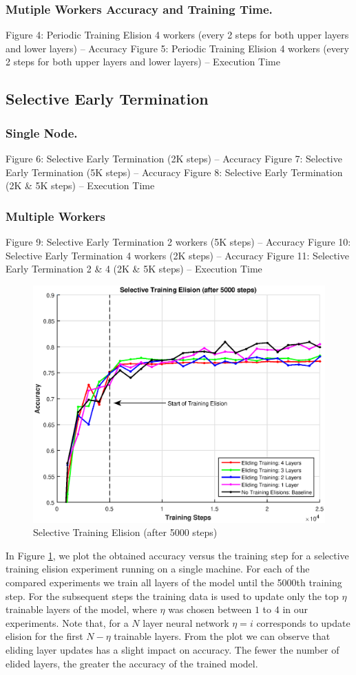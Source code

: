 \subsubsection{Mutiple Workers Accuracy and Training Time.}
Figure 4: Periodic Training Elision 4 workers (every 2 steps for both upper layers and lower layers) -- Accuracy
Figure 5: Periodic Training Elision 4 workers (every 2 steps for both upper layers and lower layers) -- Execution Time
\subsection{Selective Early Termination}
\subsubsection{Single Node.} 
Figure 6: Selective Early Termination (2K steps) -- Accuracy
Figure 7: Selective Early Termination (5K steps) -- Accuracy
Figure 8: Selective Early Termination (2K \& 5K steps) -- Execution Time
\subsubsection{Multiple Workers}
Figure 9: Selective Early Termination 2 workers (5K steps) -- Accuracy 
Figure 10: Selective Early Termination 4 workers (2K steps) -- Accuracy
Figure 11: Selective Early Termination 2 \& 4 (2K \& 5K steps) -- Execution Time
\begin{figure}[t]
	\centering
	\includegraphics[width=0.8\columnwidth]{figures/approx.eps}
	\caption{Selective Training Elision (after 5000 steps)}
	\label{fig:approx}
\end{figure}

In Figure \ref{fig:approx}, we plot the obtained accuracy versus the training step for a selective training elision experiment running on a single machine. For each of the compared experiments we train all layers of the model until the 5000th training step. For the subsequent steps the training data is used to update only the top $\eta$ trainable layers of the model, where $\eta$ was chosen between $1$ to $4$ in our experiments. Note that, for a $N$ layer neural network $\eta=i$ corresponds to update elision for the first $N-\eta$ trainable layers. From the plot we can observe that eliding layer updates has a slight impact on accuracy. The fewer the number of elided layers, the greater the accuracy of the trained model. 

